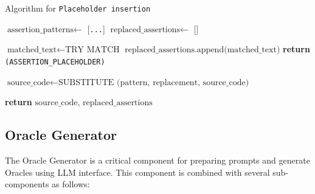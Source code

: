         \begin{algorithm}[H]
        \caption{Algorithm for \texttt{Placeholder insertion}}
        \label{algorithm_placeholder_insertion}
        \begin{algorithmic}[1]
            \State $\text{assertion\_patterns} \gets$ [\texttt{...}] 
            \State $\text{replaced\_assertions} \gets$ [] 
        
                    \State $\text{matched\_text} \gets \text{TRY MATCH}$
                    \State $\text{replaced\_assertions.append(matched\_text)}$
                    \State \textbf{return} \texttt{(ASSERTION\_PLACEHOLDER)}
                \EndFunction
        
                \State $\text{source\_code} \gets \text{SUBSTITUTE (pattern, replacement, source\_code)}$
            \EndFor
        
            \State \textbf{return} $\text{source\_code, replaced\_assertions}$
        \EndFunction
        \end{algorithmic}
        \end{algorithm}
    
\vspace{0.1 cm}
\subsection{Oracle Generator}
\label{subsec:oracle_generator}
\vspace{0.1 cm}

    The Oracle Generator is a critical component for preparing prompts and generate Oracles using LLM interface. This component is combined with several sub-components as follows:

